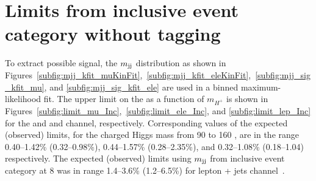 
\section{Limits from inclusive event category without  tagging}
\label{ss:limit_Inc}
To extract possible signal, the $m_\text{jj}$ distribution as shown in Figures~\ref{subfig:mjj_kfit_muKinFit},~\ref{subfig:mjj_kfit_eleKinFit},~\ref{subfig:mjj_sig_kfit_mu}, and \ref{subfig:mjj_sig_kfit_ele} are used in a binned maximum-likelihood fit. The upper limit on the \brThb as a function of $m_{H^{+}}$ is 
shown in Figures~\ref{subfig:limit_mu_Inc},~\ref{subfig:limit_ele_Inc}, and \ref{subfig:limit_lep_Inc}
for the \mujets and \ejets and \ljets channel, respectively. 
Corresponding values of the expected (observed) limits, for the charged Higgs mass 
from 90 to 160 \GeV, are in the range 0.40--1.42\% (0.32--0.98\%), 0.44--1.57\% (0.28--2.35\%), 
and 0.32--1.08\% (0.18--1.04) respectively. The expected (observed) limits using $m_\text{jj}$ from 
inclusive event category at 8 \TeV was in range 1.4--3.6\% (1.2--6.5\%) for lepton + jets 
channel~\cite{Khachatryan:2015uua}.
